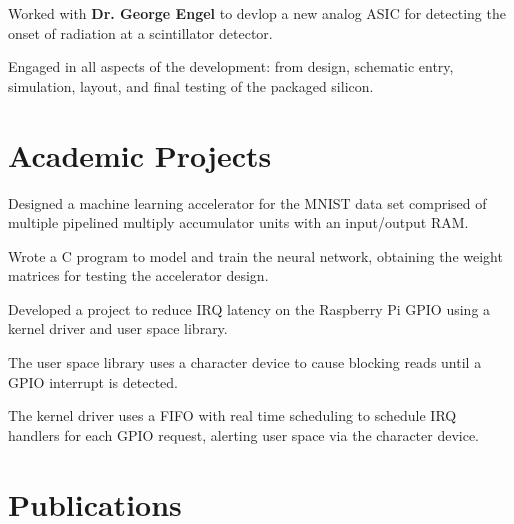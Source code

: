\documentclass[]{deedy-resume-openfont}
\begin{document}
\begin{minipage}[t]{0.66\textwidth}
\begin{tightemize}
\item Worked with \textbf{Dr. George Engel} to devlop a new analog ASIC for detecting the onset of radiation at a scintillator detector. 
\item Engaged in all aspects of the development: from design, schematic entry, simulation, layout, and final testing of the packaged silicon. 
\end{tightemize}
\sectionsep


\section{Academic Projects}
\begin{tightemize}
\item Designed a machine learning accelerator for the MNIST data set comprised of multiple pipelined multiply accumulator units with an input/output RAM. 
\item Wrote a C program to model and train the neural network, obtaining the weight matrices for testing the accelerator design.
\end{tightemize}
\sectionsep

\begin{tightemize}
\item Developed a project to reduce IRQ latency on the Raspberry Pi GPIO using a kernel driver and user space library. 
\item The user space library uses a character device to cause blocking reads until a GPIO interrupt is detected. 
\item The kernel driver uses a FIFO with real time scheduling to schedule IRQ handlers for each GPIO request, alerting user space via the character device.
\end{tightemize}
\sectionsep


\section{Publications} 
\renewcommand\refname{\vskip -1.5em} %


\nocite{*}

\end{minipage} 
\end{document}
